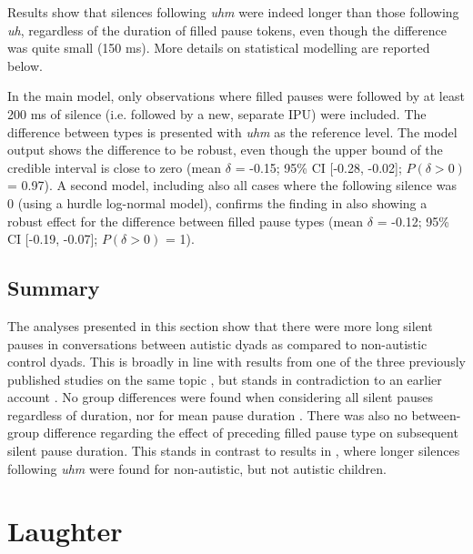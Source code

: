 Results show that silences following \emph{uhm} were indeed longer than those following \emph{uh}, regardless of the duration of filled pause tokens, even though the difference was quite small (150 ms). More details on statistical modelling are reported below.

In the main model, only observations where filled pauses were followed by at least 200 ms of silence (i.e. followed by a new, separate IPU) were included. The difference between types is presented with \emph{uhm} as the reference level. The model output shows the difference to be robust, even though the upper bound of the credible interval is close to zero (mean \(\delta\) = -0.15; 95\% CI {[}-0.28, -0.02{]}; \(P(\delta > 0)\) = 0.97). A second model, including also all cases where the following silence was 0 (using a hurdle log-normal model), confirms the finding in also showing a robust effect for the difference between filled pause types (mean \(\delta\) = -0.12; 95\% CI {[}-0.19, -0.07{]}; \(P(\delta > 0)\) = 1).

\subsection{Summary}\label{BCFP_FP_silent_discussion}

The analyses presented in this section show that there were more long silent pauses in conversations between autistic dyads as compared to non-autistic control dyads. This is broadly in line with results from one of the three previously published studies on the same topic \citep{lakeListenerVsSpeakeroriented2011}, but stands in contradiction to an earlier account \citep{thurberPausesNarrativesProduced1993}. No group differences were found when considering all silent pauses regardless of duration, nor for mean pause duration \citep[similarly to results in][]{engelhardtSpeakerVersusListenerOrientedDisfluency2017}. There was also no between-group difference regarding the effect of preceding filled pause type on subsequent silent pause duration. This stands in contrast to results in \citet{lunsfordAutismUseFillers2010}, where longer silences following \emph{uhm} were found for non-autistic, but not autistic children.







\section {Laughter}\label{sec:BCFP_Laughter}

